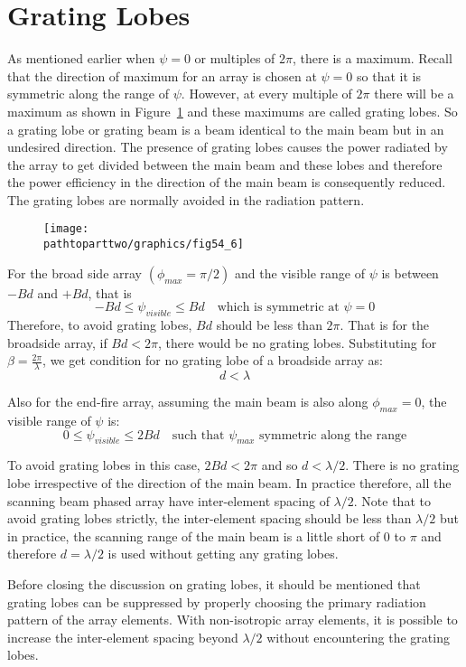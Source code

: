\section{Grating Lobes}
As mentioned earlier when $\psi = 0 $ or multiples of $2\pi$, there is a maximum. Recall that the direction of maximum for an array is chosen at $\psi = 0$ so that it is symmetric along the range of $\psi$. However, at every multiple of $2\pi$ there will be a maximum as shown in Figure~\ref{54.9} and these maximums are called grating lobes. So a grating lobe or grating beam is a beam identical to the main beam but in an undesired direction. The presence of grating lobes causes the power radiated by the array to get divided between the main beam and these lobes and therefore the power efficiency in the direction of the main beam is consequently reduced. The grating lobes are normally avoided in the radiation pattern.
\begin{figure}[h]
\texttt{[image: \\pathtoparttwo/graphics/fig54\_6]}
\centering
\caption{}
\label{54.9}
\end{figure}

For the broad side array $(\phi_{max} = \pi/2)$ and the visible range of $\psi$ is between $-Bd$ and $+Bd$, that is
$$
-Bd \leq \psi_{visible} \leq Bd \quad \text{which is symmetric at $\psi =0$}
$$
Therefore, to avoid grating lobes, $Bd$ should be less than $2\pi$. That is for the broadside array, if $Bd < 2\pi$, there would be no grating lobes. Substituting for $\beta = \frac{2\pi}{\lambda}$, we get condition for no grating lobe of a broadside array as:
$$d < \lambda $$

Also for the end-fire array, assuming the main beam is also along $\phi_{max} = 0$, the visible range of $\psi$ is:
$$
0 \leq \psi_{visible} \leq 2Bd \quad \text{such that $\psi_{max}$ symmetric along the range}
$$

To avoid grating lobes in this case, $2Bd < 2 \pi$ and so $d < \lambda/2$. There is no grating lobe irrespective of the direction of the main beam. In practice therefore, all the scanning beam phased array have inter-element spacing of $\lambda /2$. Note that to avoid grating lobes strictly, the inter-element spacing should be less than $\lambda / 2$ but in practice, the scanning range of the main beam is a little short of $0$ to $\pi$ and therefore $d=\lambda/2$ is used without getting any grating lobes.

Before closing the discussion on grating lobes, it should be mentioned that grating lobes can be suppressed by properly choosing the primary radiation pattern of the array elements. With  non-isotropic array elements, it is possible to increase the inter-element spacing beyond $\lambda/2$ without encountering the grating lobes.